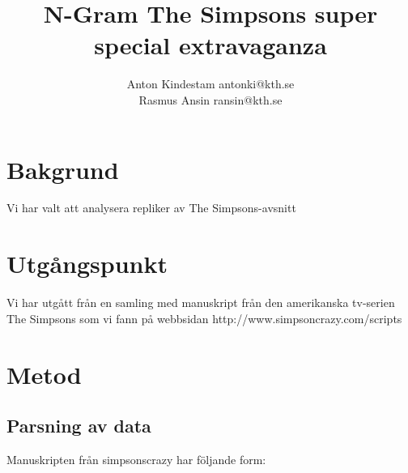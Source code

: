 \documentclass[a4paper]{article}
\author{Anton Kindestam antonki@kth.se\\Rasmus Ansin ransin@kth.se}
\title{N-Gram The Simpsons super special extravaganza}
\begin{document}
\maketitle

\section{Bakgrund}

Vi har valt att analysera repliker av The Simpsons-avsnitt 

\section{Utgångspunkt}

Vi har utgått från en samling med manuskript från den amerikanska tv-serien The Simpsons som vi fann på webbsidan http://www.simpsoncrazy.com/scripts

\section{Metod}

\subsection{Parsning av data}
Manuskripten från simpsonscrazy har följande form:
\end{document}
